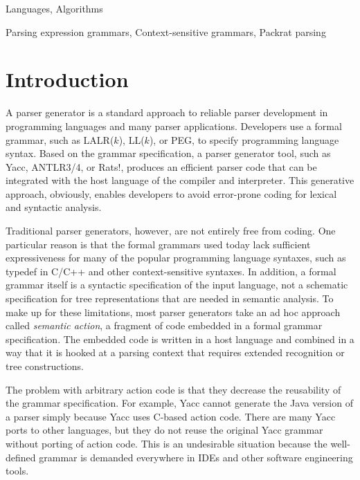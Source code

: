 \documentclass[preprint]{sigplanconf}
\begin{document}

\terms
Languages, Algorithms

\keywords
Parsing expression grammars, Context-sensitive grammars, Packrat parsing

\section{Introduction}

A parser generator is a standard approach to reliable parser development in programming languages and many parser applications. Developers use a formal grammar, such as LALR($k$), LL($k$), or PEG, to specify programming language syntax. Based on the grammar specification, a parser generator tool, such as Yacc\cite{Yacc}, ANTLR3/4\cite{PLDI11_Antlr}, or Rats$!$\cite{PLDI06_Rats}, produces an efficient parser code that can be integrated with the host language of the compiler and interpreter. This generative approach, obviously, enables developers to avoid error-prone coding for lexical and syntactic analysis. 

Traditional parser generators, however, are not entirely free from coding. One particular reason is that the formal grammars used today lack sufficient expressiveness for many of the popular programming language syntaxes, such as typedef in C/C++ and other context-sensitive syntaxes\cite{POPL04_PEG,PLDI06_Rats,ONWARD15_Iguana}. In addition, a formal grammar itself is a syntactic specification of the input language, not a schematic specification for tree representations that are needed in semantic analysis. To make up for these limitations, most parser generators take an ad hoc approach called {\em semantic action}, a fragment of code embedded in a formal grammar specification. The embedded code is written in a host language and combined in a way that it is hooked at a parsing context that requires extended recognition or tree constructions. 

The problem with arbitrary action code is that they decrease the reusability of the grammar specification\cite{ICPC08_SemanticActions}. For example, Yacc cannot generate the Java version of a parser simply because Yacc uses C-based action code. There are many Yacc ports to other languages, but they do not reuse the original Yacc grammar without porting of action code. This is an undesirable situation because the well-defined grammar is demanded everywhere in IDEs and other software engineering tools\cite{OOPSLA11_Spoofax}. 
\end{document}
